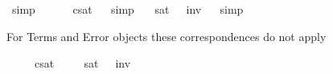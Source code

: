 \begin{isabellebody}
\ simp\ \isamarkupfalse%
%
\endisatagproof
{\isafoldproof}%
%
\isadelimproof
%
\endisadelimproof
\isanewline
{}\isamarkupfalse%
\ \ {\isachardoublequoteopen}{\isacharbrackleft}{\isacharsemicolon}{\isasymphi}{\isacharsemicolon}{\isacharbrackright}\ {\isasymlongleftrightarrow}\ {\isasymnot}\ {\isacharbrackleft}{\isacharsemicolon}{\isasymphi}{\isacharsemicolon}{\isacharbrackright}\isactrlsup c\isactrlsup s\isactrlsup a\isactrlsup t{\isachardoublequoteclose}%
\isadelimproof
\ %
\endisadelimproof
%
\isatagproof
{}\isamarkupfalse%
\ simp\ \isamarkupfalse%
%
\endisatagproof
{\isafoldproof}%
%
\isadelimproof
%
\endisadelimproof
\isanewline
{}\isamarkupfalse%
\ \ {\isachardoublequoteopen}{\isacharbrackleft}{\isacharsemicolon}{\isasymphi}{\isacharsemicolon}{\isacharbrackright}\isactrlsup s\isactrlsup a\isactrlsup t\ {\isasymlongleftrightarrow}\ {\isasymnot}\ {\isacharbrackleft}{\isacharsemicolon}{\isasymphi}{\isacharsemicolon}{\isacharbrackright}\isactrlsup i\isactrlsup n\isactrlsup v{\isachardoublequoteclose}%
\isadelimproof
\ %
\endisadelimproof
%
\isatagproof
{}\isamarkupfalse%
\ simp\ \isamarkupfalse%
%
\endisatagproof
{\isafoldproof}%
%
\isadelimproof
%
\endisadelimproof
%
\begin{isamarkuptext}%
For Terms and Error objects these correspondences do not apply%
\end{isamarkuptext}%
\isamarkuptrue%
\isamarkupfalse%
\ \ {\isachardoublequoteopen}{\isacharbrackleft}{\isachardot}{\isasymphi}{\isachardot}{\isacharbrackright}\ {\isasymlongleftrightarrow}\ {\isasymnot}\ {\isacharbrackleft}{\isachardot}{\isasymphi}{\isachardot}{\isacharbrackright}\isactrlsup c\isactrlsup s\isactrlsup a\isactrlsup t{\isachardoublequoteclose}\ \isamarkupfalse%
%
\isadelimproof
\ %
\endisadelimproof
%
\isatagproof
{}\isamarkupfalse%
%
\endisatagproof
{\isafoldproof}%
%
\isadelimproof
%
\endisadelimproof
\isanewline
{}\isamarkupfalse%
\ \ {\isachardoublequoteopen}{\isacharbrackleft}{\isachardot}{\isasymphi}{\isachardot}{\isacharbrackright}\isactrlsup s\isactrlsup a\isactrlsup t\ {\isasymlongleftrightarrow}\ {\isasymnot}\ {\isacharbrackleft}{\isachardot}{\isasymphi}{\isachardot}{\isacharbrackright}\isactrlsup i\isactrlsup n\isactrlsup v{\isachardoublequoteclose}\ \isamarkupfalse%
%
\isadelimproof
\ %
\endisadelimproof
%
\isatagproof
{}\isamarkupfalse%
%
\endisatagproof
{\isafoldproof}%
%
\isadelimproof

\end{isabellebody}
